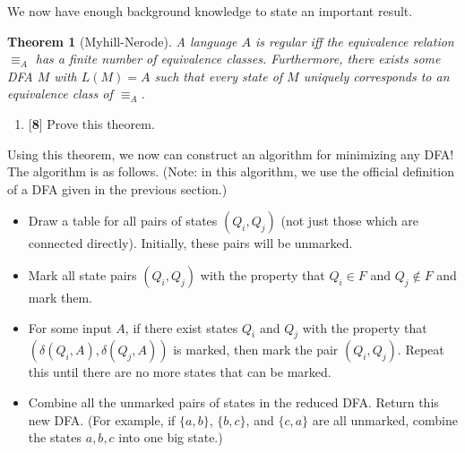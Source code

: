 \documentclass[11pt]{article}
\newtheorem{thm}{Theorem}[section]
\newcounter{enum}
\begin{document}
We now have enough background knowledge to state an important result.

\begin{thm}[Myhill-Nerode]A language $A$ is regular iff the equivalence relation $\equiv_A$ has a finite number of equivalence classes.  Furthermore, there exists some DFA $M$ with $L(M)=A$ such that every state of $M$ uniquely corresponds to an equivalence class of $\equiv_A$.
\end{thm}

\begin{enumerate}
\setcounter{enumi}{\theenum}

\item {[}\textbf{8}{]} Prove this theorem.

\setcounter{enum}{\theenumi}
\end{enumerate}

Using this theorem, we now can construct an algorithm for minimizing any DFA!  The algorithm is as follows.  (Note: in this algorithm, we use the official definition of a DFA given in the previous section.)

\begin{itemize}

\item Draw a table for all pairs of states $(Q_i,Q_j)$ (not just those which are connected directly).  Initially, these pairs will be unmarked.

\item Mark all state pairs $(Q_i,Q_j)$ with the property that $Q_i\in F$ and $Q_j\not\in F$ and mark them.

\item For some input $A$, if there exist states $Q_i$ and $Q_j$ with the property that $(\delta(Q_i,A),\delta(Q_j,A))$ is marked, then mark the pair $(Q_i,Q_j)$.  Repeat this until there are no more states that can be marked.

\item Combine all the unmarked pairs of states in the reduced DFA.  Return this new DFA.  (For example, if $\{a,b\}$, $\{b,c\}$, and $\{c,a\}$ are all unmarked, combine the states $a,b,c$ into one big state.)

\end{itemize}

\newpage
\end{document}
